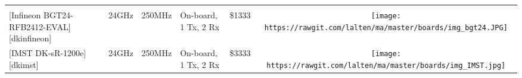 \begin{longtable}[]{@{}llllllc@{}}
\begin{minipage}[t]{0.10\columnwidth}
\end{minipage}\tabularnewline
\begin{minipage}[t]{0.09\columnwidth}\raggedright\strut
{[}Infineon BGT24-RFB2412-EVAL{]}{[}dkinfineon{]}\strut
\end{minipage} & \begin{minipage}[t]{0.13\columnwidth}\raggedright\strut
\strut
\end{minipage} & \begin{minipage}[t]{0.09\columnwidth}\raggedright\strut
24GHz\strut
\end{minipage} & \begin{minipage}[t]{0.11\columnwidth}\raggedright\strut
250MHz\strut
\end{minipage} & \begin{minipage}[t]{0.10\columnwidth}\raggedright\strut
On-board, 1 Tx, 2 Rx\strut
\end{minipage} & \begin{minipage}[t]{0.15\columnwidth}\raggedright\strut
\$1333\strut
\end{minipage} & \begin{minipage}[t]{0.10\columnwidth}\centering\strut
\texttt{[image: https://rawgit.com/lalten/ma/master/boards/img\_bgt24.JPG]}\strut
\end{minipage}\tabularnewline
\begin{minipage}[t]{0.09\columnwidth}\raggedright\strut
{[}IMST DK-sR-1200e{]}{[}dkimst{]}\strut
\end{minipage} & \begin{minipage}[t]{0.13\columnwidth}\raggedright\strut
\strut
\end{minipage} & \begin{minipage}[t]{0.09\columnwidth}\raggedright\strut
24GHz\strut
\end{minipage} & \begin{minipage}[t]{0.11\columnwidth}\raggedright\strut
250MHz\strut
\end{minipage} & \begin{minipage}[t]{0.10\columnwidth}\raggedright\strut
On-board, 1 Tx, 2 Rx\strut
\end{minipage} & \begin{minipage}[t]{0.15\columnwidth}\raggedright\strut
\$3333\strut
\end{minipage} & \begin{minipage}[t]{0.10\columnwidth}\centering\strut
\texttt{[image: https://rawgit.com/lalten/ma/master/boards/img\_IMST.jpg]}\strut

\end{minipage}
\end{longtable}
